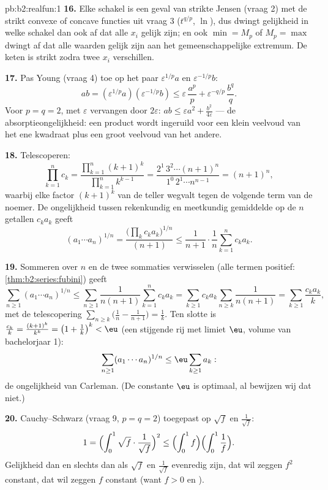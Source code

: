 \begin{solution}{pb:b2:realfun:1}
\textbf{16.} Elke schakel is een geval van strikte Jensen (vraag 2)
met de strikt convexe of concave functies uit vraag 3 ($t^{q/p}$,
$\ln$), dus dwingt gelijkheid in welke schakel dan ook af dat alle
$x_i$ gelijk zijn; en ook $\min = M_p$ of $M_p = \max$ dwingt af
dat alle waarden gelijk zijn aan het gemeenschappelijke extremum.
De keten is strikt zodra twee $x_i$ verschillen.

\textbf{17.} Pas Young (vraag 4) toe op het paar
$\varepsilon^{1/p}a$ en $\varepsilon^{-1/p}b$:
\[
ab = (\varepsilon^{1/p}a)(\varepsilon^{-1/p}b)
\leq \varepsilon\,\frac{a^p}p +
\varepsilon^{-q/p}\,\frac{b^q}q .
\]
Voor $p = q = 2$, met $\varepsilon$ vervangen door
$2\varepsilon$: $ab \leq \varepsilon a^2 +
\frac{b^2}{4\varepsilon}$ --- de absorptieongelijkheid: een
product wordt ingeruild voor een klein veelvoud van het ene
kwadraat plus een groot veelvoud van het andere.

\textbf{18.} Telescoperen:
\[
\prod_{k=1}^{n}c_k = \frac{\prod_{k=1}^n(k+1)^k}
{\prod_{k=1}^{n}k^{k-1}}
= \frac{2^1\,3^2\cdots(n+1)^n}{1^0\,2^1\cdots n^{n-1}}
= (n+1)^n,
\]
waarbij elke factor $(k+1)^k$ van de teller wegvalt tegen de
volgende term van de noemer. De ongelijkheid tussen rekenkundig en
meetkundig gemiddelde op de $n$ getallen $c_ka_k$ geeft
\[
(a_1\cdots a_n)^{1/n} =
\frac{\bigl(\prod_k c_ka_k\bigr)^{1/n}}{(n+1)}
\leq \frac{1}{n+1}\cdot\frac1n\sum_{k=1}^{n}c_ka_k .
\]

\textbf{19.} Sommeren over $n$ en de twee sommaties verwisselen
(alle termen positief: \cref{thm:b2:series:fubini}) geeft
\[
\sum_{n\geq1}(a_1\cdots a_n)^{1/n}
\leq \sum_{n\geq1}\frac{1}{n(n+1)}\sum_{k=1}^{n}c_ka_k
= \sum_{k\geq1}c_ka_k\sum_{n\geq k}\frac1{n(n+1)}
= \sum_{k\geq1}\frac{c_ka_k}{k},
\]
met de telescopering $\sum_{n\geq k}\bigl(\frac1n -
\frac1{n+1}\bigr) = \frac1k$. Ten slotte is $\frac{c_k}k =
\frac{(k+1)^k}{k^k} = \bigl(1 + \frac1k\bigr)^k < \eu$ (een
stijgende rij met limiet $\eu$, volume van bachelorjaar 1):
\[
\sum_{n\geq1}(a_1\cdots a_n)^{1/n} \leq
\eu\sum_{k\geq1}a_k :
\]
de ongelijkheid van Carleman. (De constante $\eu$ is optimaal, al
bewijzen wij dat niet.)

\textbf{20.} Cauchy--Schwarz (vraag 9, $p = q = 2$) toegepast op
$\sqrt f$ en $\frac1{\sqrt f}$:
\[
1 = \Bigl(\int_0^1\sqrt f\cdot\frac{1}{\sqrt f}\Bigr)^{2}
\leq \Bigl(\int_0^1 f\Bigr)\Bigl(\int_0^1\frac1f\Bigr).
\]
Gelijkheid dan en slechts dan als $\sqrt f$ en $\frac1{\sqrt f}$
evenredig zijn, dat wil zeggen $f^2$ constant, dat wil zeggen $f$
constant (want $f > 0$ en ).


\end{solution}
